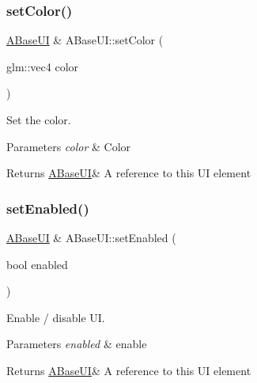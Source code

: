 \subsubsection{\texorpdfstring{set\+Color()}{setColor()}}
{\footnotesize\ttfamily \hyperlink{class_a_base_u_i}{A\+Base\+UI} \& A\+Base\+U\+I\+::set\+Color (\begin{DoxyParamCaption}\item[{glm\+::vec4}]{color }\end{DoxyParamCaption})\hspace{0.3cm}{\ttfamily [virtual]}}



Set the color. 


\begin{DoxyParams}{Parameters}
{\em color} & Color \\
\hline
\end{DoxyParams}
\begin{DoxyReturn}{Returns}
\hyperlink{class_a_base_u_i}{A\+Base\+UI}\& A reference to this UI element 
\end{DoxyReturn}
\mbox{\label{class_a_base_u_i_a9b19e675593c03f7d5becbd580bc418b}} 
\subsubsection{\texorpdfstring{set\+Enabled()}{setEnabled()}}
{\footnotesize\ttfamily \hyperlink{class_a_base_u_i}{A\+Base\+UI} \& A\+Base\+U\+I\+::set\+Enabled (\begin{DoxyParamCaption}\item[{bool}]{enabled }\end{DoxyParamCaption})\hspace{0.3cm}{\ttfamily [virtual]}}



Enable / disable UI. 


\begin{DoxyParams}{Parameters}
{\em enabled} & enable \\
\hline
\end{DoxyParams}
\begin{DoxyReturn}{Returns}
\hyperlink{class_a_base_u_i}{A\+Base\+UI}\& A reference to this UI element 
\end{DoxyReturn}
\mbox{\label{class_a_base_u_i_a7581ff93412a1559479aed8d9aa61bbe}} 
